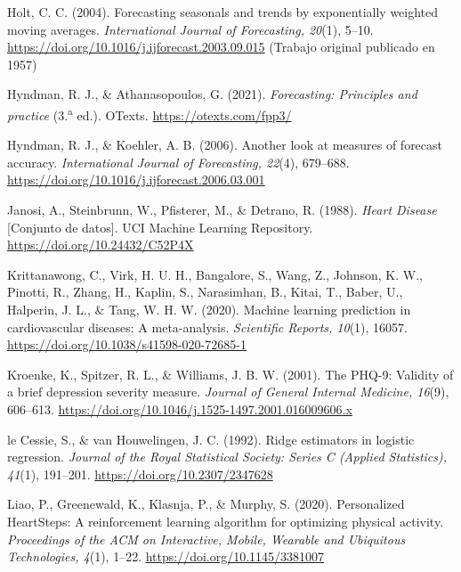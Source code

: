 \documentclass[12pt,letterpaper]{article}
\begin{document}
\begin{enumerate}[label={[\arabic*]}, leftmargin=2.2em]
\item Holt, C. C. (2004). Forecasting seasonals and trends by exponentially
weighted moving averages. \textit{International Journal of Forecasting, 20}(1),
5--10. \url{https://doi.org/10.1016/j.ijforecast.2003.09.015} (Trabajo original
publicado en 1957)

\item Hyndman, R. J., \& Athanasopoulos, G. (2021). \textit{Forecasting:
Principles and practice} (3.\textsuperscript{a} ed.). OTexts. \url{https://otexts.com/fpp3/}

\item Hyndman, R. J., \& Koehler, A. B. (2006). Another look at measures of
forecast accuracy. \textit{International Journal of Forecasting, 22}(4),
679--688. \url{https://doi.org/10.1016/j.ijforecast.2006.03.001}

\item Janosi, A., Steinbrunn, W., Pfisterer, M., \& Detrano, R. (1988).
\textit{Heart Disease} [Conjunto de datos]. UCI Machine Learning Repository.
\url{https://doi.org/10.24432/C52P4X}

\item Krittanawong, C., Virk, H. U. H., Bangalore, S., Wang, Z., Johnson, K. W.,
Pinotti, R., Zhang, H., Kaplin, S., Narasimhan, B., Kitai, T., Baber, U.,
Halperin, J. L., \& Tang, W. H. W. (2020). Machine learning prediction in
cardiovascular diseases: A meta-analysis. \textit{Scientific Reports, 10}(1),
16057. \url{https://doi.org/10.1038/s41598-020-72685-1}

\item Kroenke, K., Spitzer, R. L., \& Williams, J. B. W. (2001). The PHQ-9:
Validity of a brief depression severity measure. \textit{Journal of General
Internal Medicine, 16}(9), 606--613.
\url{https://doi.org/10.1046/j.1525-1497.2001.016009606.x}

\item le Cessie, S., \& van Houwelingen, J. C. (1992). Ridge estimators in
logistic regression. \textit{Journal of the Royal Statistical Society: Series C
(Applied Statistics), 41}(1), 191--201. \url{https://doi.org/10.2307/2347628}

\item Liao, P., Greenewald, K., Klasnja, P., \& Murphy, S. (2020). Personalized
HeartSteps: A reinforcement learning algorithm for optimizing physical activity.
\textit{Proceedings of the ACM on Interactive, Mobile, Wearable and Ubiquitous
Technologies, 4}(1), 1--22. \url{https://doi.org/10.1145/3381007}


\end{enumerate}
\end{document}
